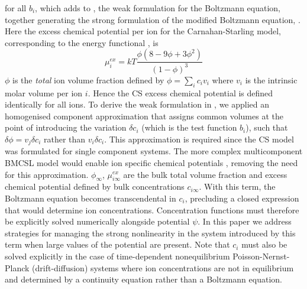 for all $b_i$, which adds to , the weak
formulation for the Boltzmann equation, together generating the strong
formulation of the modified Boltzmann
equation,  .  Here the excess chemical potential
per ion for the Carnahan-Starling model, corresponding to the energy
functional , is
\begin{equation}
    \mu_{i}^{ex} = kT \frac{\phi(8-9\phi+3\phi^2)}{(1-\phi)^3}
    \label{chem_pot_CS}
\end{equation}
$\phi$ is the \emph{total} ion volume fraction defined by
$\phi=\sum_i c_i v_i$ where $v_i$ is the intrinsic molar volume per
ion $i$. Hence the CS excess chemical potential is defined identically
for all ions. To derive the weak formulation in , we
applied an homogenised component approximation that assigns common
volumes at the point of introducing the variation  $\delta c_i$ (which
is the test function $b_i$), such that $\delta\phi=v_j \delta c_i$ rather
than $v_i \delta c_i$. This approximation is required since the CS
model was formulated for single component systems. The more complex
multicomponent BMCSL model would enable ion specific chemical
potentials \cite{MansooriCarnahanStarlingLeland1971}, removing the
need for this approximation.  $\phi_{\infty}$, $\mu_{i\infty}^{ex}$
are the bulk total volume fraction and excess chemical potential
defined by bulk concentrations $c_{i\infty}$. With this term, the
Boltzmann equation  becomes transcendental in $c_i$, precluding a closed
expression that would determine ion concentrations. Concentration functions must therefore be
explicitly solved  numerically alongside potential $\psi$. In this
paper we address strategies for managing the strong nonlinearity in
the system introduced by this term when large values of the
potential are present. Note that $c_i$ must also be solved explicitly in the case
of time-dependent nonequilibrium Poisson-Nernst-Planck (drift-diffusion) systems \cite{LopezGarciaHornoGrosse2018} where
ion concentrations are not in equilibrium and determined by a
continuity equation rather than a Boltzmann equation.

